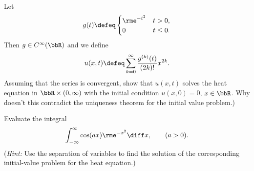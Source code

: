 \begin{problem}
  Let
  \[
    g(t)\defeq
    \begin{cases}
      \rme^{-t^2}&t>0,\\
      0&t\leq 0.
    \end{cases}
  \]
  Then \(g\in C^\infty(\bbR)\) and we define
  \[
    u(x,t)\defeq\sum_{k=0}^\infty\frac{g^{(k)}(t)}{(2k)!}x^{2k}.
  \]
  Assuming that the series is convergent, show that \(u(x,t)\) solves the
  heat equation in \(\bbR\times(0,\infty)\) with the initial condition
  \(u(x,0)=0\), \(x\in\bbR\). Why doesn't this contradict the uniqueness
  theorem for the initial value problem.)
\end{problem}
\begin{solution}
\end{solution}
\newpage

\begin{problem}
  Evaluate the integral
  \[
    \int_{-\infty}^\infty \cos(ax)\rme^{-x^2}\diff x,\qquad (a>0).
  \]
  \noindent (\emph{Hint:} Use the separation of variables to find the
  solution of the corresponding initial-value problem for the heat
  equation.)
\end{problem}
\begin{solution}
\end{solution}

